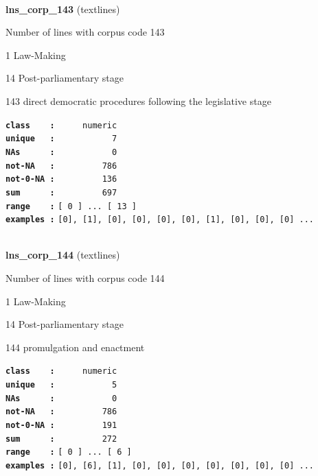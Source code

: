 \documentclass[]{article}
\begin{document}
~

\textbf{lns\_corp\_143} (textlines)

Number of lines with corpus code 143

1 Law-Making

14 Post-parliamentary stage

143 direct democratic procedures following the legislative stage

\textbf{\texttt{class\ \ \ \ :}} \texttt{~~~~~numeric}\\
\textbf{\texttt{unique\ \ \ :}} \texttt{~~~~~~~~~~~7}\\
\textbf{\texttt{NAs\ \ \ \ \ \ :}} \texttt{~~~~~~~~~~~0}\\
\textbf{\texttt{not-NA\ \ \ :}} \texttt{~~~~~~~~~786}\\
\textbf{\texttt{not-0-NA\ :}} \texttt{~~~~~~~~~136}\\
\textbf{\texttt{sum\ \ \ \ \ \ :}} \texttt{~~~~~~~~~697}\\
\textbf{\texttt{range\ \ \ \ :}}
\texttt{{[}\ 0\ {]}\ ...\ {[}\ 13\ {]}}\\
\textbf{\texttt{examples\ :}}
\texttt{{[}0{]},\ {[}1{]},\ {[}0{]},\ {[}0{]},\ {[}0{]},\ {[}0{]},\ {[}1{]},\ {[}0{]},\ {[}0{]},\ {[}0{]}\ ...}\\

~

\textbf{lns\_corp\_144} (textlines)

Number of lines with corpus code 144

1 Law-Making

14 Post-parliamentary stage

144 promulgation and enactment

\textbf{\texttt{class\ \ \ \ :}} \texttt{~~~~~numeric}\\
\textbf{\texttt{unique\ \ \ :}} \texttt{~~~~~~~~~~~5}\\
\textbf{\texttt{NAs\ \ \ \ \ \ :}} \texttt{~~~~~~~~~~~0}\\
\textbf{\texttt{not-NA\ \ \ :}} \texttt{~~~~~~~~~786}\\
\textbf{\texttt{not-0-NA\ :}} \texttt{~~~~~~~~~191}\\
\textbf{\texttt{sum\ \ \ \ \ \ :}} \texttt{~~~~~~~~~272}\\
\textbf{\texttt{range\ \ \ \ :}}
\texttt{{[}\ 0\ {]}\ ...\ {[}\ 6\ {]}}\\
\textbf{\texttt{examples\ :}}
\texttt{{[}0{]},\ {[}6{]},\ {[}1{]},\ {[}0{]},\ {[}0{]},\ {[}0{]},\ {[}0{]},\ {[}0{]},\ {[}0{]},\ {[}0{]}\ ...}\\
\end{document}
